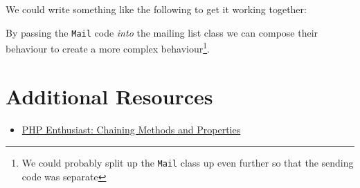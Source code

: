 We could write something like the following to get it working together:



By passing the \texttt{Mail} code \textit{into} the mailing list class we can compose their behaviour to create a more complex behaviour\footnote{We could probably split up the \texttt{Mail} class up even further so that the sending code was separate}.


\section{Additional Resources}

\begin{itemize}[leftmargin=*]
    \item \href{ https://phpenthusiast.com/object-oriented-php-tutorials/chaining-methods-and-properties}{PHP Enthusiast: Chaining Methods and Properties}
\end{itemize}
